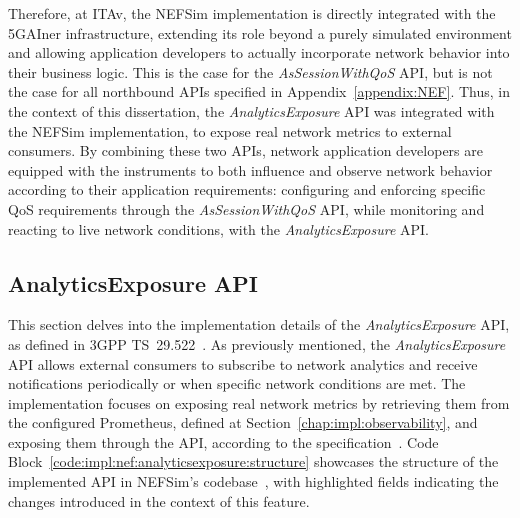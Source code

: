 Therefore, at \acs{ITAv}, the NEFSim implementation is directly integrated with the 5GAIner infrastructure, extending its role beyond a purely simulated environment and allowing application developers to actually incorporate network behavior into their business logic. This is the case for the \textit{AsSessionWithQoS} \acs{API}, but is not the case for all northbound \acsp{API} specified in Appendix~\ref{appendix:NEF}. Thus, in the context of this dissertation, the \textit{AnalyticsExposure} \acs{API} was integrated with the NEFSim implementation, to expose real network metrics to external consumers. By combining these two \acsp{API}, network application developers are equipped with the instruments to both influence and observe network behavior according to their application requirements: configuring and enforcing specific \acs{QoS} requirements through the \textit{AsSessionWithQoS} \acs{API}, while monitoring and reacting to live network conditions, with the \textit{AnalyticsExposure} \acs{API}.

\subsection{AnalyticsExposure \acs{API}}
\label{chap:impl:nef:AnalyticsExposure}

This section delves into the implementation details of the \textit{AnalyticsExposure} \acs{API}, as defined in \acs{3GPP} TS~29.522~\cite{ETSI_TS_129_522_V18_11_0}. As previously mentioned, the \textit{AnalyticsExposure} \acs{API} allows external consumers to subscribe to network analytics and receive notifications periodically or when specific network conditions are met. The implementation focuses on exposing real network metrics by retrieving them from the configured Prometheus, defined at Section~\ref{chap:impl:observability}, and exposing them through the \acs{API}, according to the specification~\cite{ETSI_TS_129_522_V18_11_0}. Code Block~\ref{code:impl:nef:analyticsexposure:structure} showcases the structure of the implemented \acs{API} in NEFSim's codebase~\cite{NEFemulatorAtnog}, with highlighted fields indicating the changes introduced in the context of this feature.

\begin{listing}[H]
\caption{NEFSim \textit{AnalyticsExposure} \acs{API} Implementation Structure}
\label{code:impl:nef:analyticsexposure:structure}
\end{listing}

